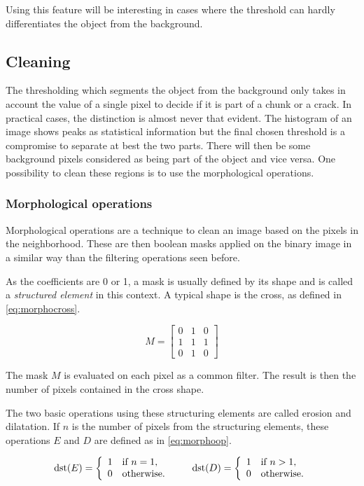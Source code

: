 Using this feature will be interesting in cases where the threshold can hardly differentiates the object from the background.

\subsection{Cleaning}

The thresholding which segments the object from the background only takes in account the value of a single pixel to decide if it is part of a chunk or a crack. In practical cases, the distinction is almost never that evident. The histogram of an image shows peaks as statistical information but the final chosen threshold is a compromise to separate at best the two parts. There will then be some background pixels considered as being part of the object and vice versa. One possibility to clean these regions is to use the morphological operations.

\subsubsection{Morphological operations}

Morphological operations are a technique to clean an image based on the pixels in the neighborhood. These are then boolean masks applied on the binary image in a similar way than the filtering operations seen before.

As the coefficients are 0 or 1, a mask is usually defined by its shape and is called a \emph{structured element} in this context. A typical shape is the cross, as defined in \eqref{eq:morphocross}.

\begin{equation}
\label{eq:morphocross}
M =
\begin{bmatrix}
0 & 1 & 0 \\
1 & 1 & 1 \\
0 & 1 & 0
\end{bmatrix}
\end{equation}

The mask $M$ is evaluated on each pixel as a common filter. The result is then the number of pixels contained in the cross shape.

The two basic operations using these structuring elements are called erosion and dilatation. If $n$ is the number of pixels from the structuring elements, these operations $E$ and $D$ are defined as in \eqref{eq:morphoop}.

\begin{equation}
\label{eq:morphoop}
\operatorname{dst}(E) =
\left\{
\begin{array}{l l}
    1 & \text{if } n = 1,\\
    0 & \text{otherwise}.
\end{array}
\right. \qquad
\operatorname{dst}(D) =
\left\{
\begin{array}{l l}
    1 & \text{if } n > 1,\\
    0 & \text{otherwise}.
\end{array}
\right.
\end{equation}

